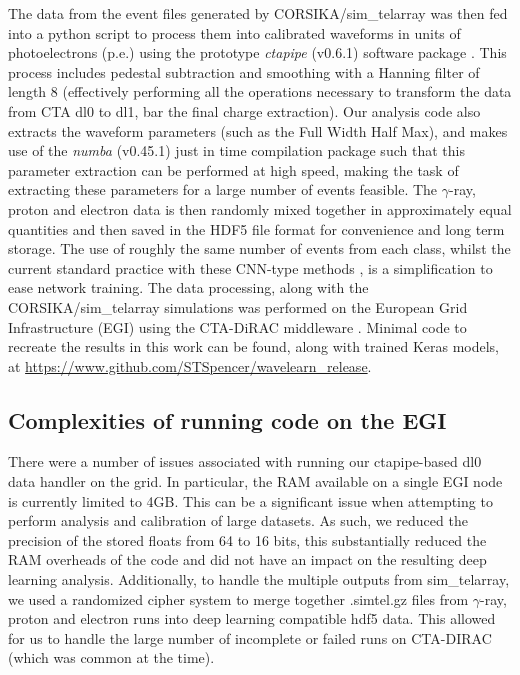 The data from the event files generated by CORSIKA/sim\_telarray was then fed into a python script to process them into calibrated waveforms in units of photoelectrons (p.e.) using the prototype \textit{ctapipe} (v0.6.1) software package \cite{ctapipe}\cite{ctapipe2}. This process includes pedestal subtraction and smoothing with a Hanning filter \cite{hanning} of length 8 (effectively performing all the operations necessary to transform the data from CTA dl0 to dl1, bar the final charge extraction). Our analysis code also extracts the waveform parameters (such as the Full Width Half Max), and makes use of the \textit{numba} \cite{numba} (v0.45.1) just in time compilation package such that this parameter extraction can be performed at high speed, making the task of extracting these parameters for a large number of events feasible. The $\gamma$-ray, proton and electron data is then randomly mixed together in approximately equal quantities and then saved in the HDF5 \cite{hdf} file format for convenience and long term storage. The use of roughly the same number of events from each class, whilst the current standard practice with these CNN-type methods \cite{Shilon}, is a simplification to ease network training. The data processing, along with the CORSIKA/sim\_telarray simulations was performed on the European Grid Infrastructure (EGI) using the CTA-DiRAC middleware \cite{luisa}. Minimal code to recreate the results in this work can be found, along with trained Keras models, at \url{https://www.github.com/STSpencer/wavelearn\_release}.

\subsection{Complexities of running code on the EGI}
There were a number of issues associated with running our ctapipe-based dl0 data handler on the grid. In particular, the RAM available on a single EGI node is currently limited to 4GB. This can be a significant issue when attempting to perform analysis and calibration of large datasets. As such, we reduced the precision of the stored floats from 64 to 16 bits, this substantially reduced the RAM overheads of the code and did not have an impact on the resulting deep learning analysis. Additionally, to handle the multiple outputs from sim\_telarray, we used a randomized cipher system to merge together .simtel.gz files from $\gamma$-ray, proton and electron runs into deep learning compatible hdf5 data. This allowed for us to handle the large number of incomplete or failed runs on CTA-DIRAC (which was common at the time).

